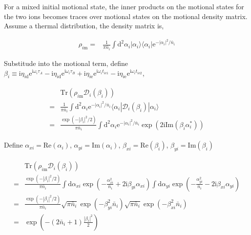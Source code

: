 \documentclass[10pt,fleqn]{article}
\newcommand{\ud}{\mathrm{d}}
\newcommand{\ue}{\mathrm{e}}
\newcommand{\ui}{\mathrm{i}}
\newcommand{\Tr}{\mathrm{Tr}}
\newcommand{\eqar}[1]
{
  \begin{align}
    #1
  \end{align}
}
\newcommand{\paren}[1]{{\left({#1}\right)}}
\newcommand{\abs}[1]{{\left|{#1}\right|}}
\begin{document}
For a mixed initial motional state, the inner products on the motional states for the two ions becomes traces over motional states on the motional density matrix. Assume a thermal distribution, the density matrix is,
\eqar{
  \rho_{i\mathrm{m}}=&\frac{1}{\pi {\bar n_i}}\int\ud^2\alpha_i |\alpha_i\rangle\langle\alpha_i|\ue^{-\abs{\alpha_i}^2/{\bar n_i}}
}
Substitude into the motional term, define $\beta_{i}\equiv\ui\eta_{i\mathrm{d}}\ue^{\ui\omega_i\tau_A}-\ui\eta_{i\mathrm{d}}\ue^{\ui\omega_i\tau_B}+\ui\eta_{i\mathrm{e}}\ue^{\ui\omega_it_{i\mathrm{e}1}}-\ui\eta_{i\mathrm{e}}\ue^{\ui\omega_it_{i\mathrm{e}2}}$,
\eqar{
  \begin{split}
    &\Tr\paren{\rho_{i\mathrm{m}}\mathcal{D}_i(\beta_i)}\\
    =&\frac{1}{\pi {\bar n_i}}\int\ud^2\alpha_i \ue^{-\abs{\alpha_i}^2/{\bar n_i}}\langle\alpha_i|\mathcal{D}_i(\beta_i)|\alpha_i\rangle\\
    =&\frac{\exp\paren{-\abs{\beta_i}^2/2}}{\pi {\bar n_i}}\int\ud^2\alpha_i \ue^{-\abs{\alpha_i}^2/{\bar n_i}}\exp\paren{2\ui\mathrm{Im}\paren{\beta_i\alpha_i^*}}
  \end{split}
}
Define $\alpha_{xi}=\mathrm{Re}(\alpha_i)$, $\alpha_{yi}=\mathrm{Im}(\alpha_i)$, $\beta_{xi}=\mathrm{Re}(\beta_i)$, $\beta_{yi}=\mathrm{Im}(\beta_i)$
\eqar{
  \begin{split}
    &\Tr\paren{\rho_{i\mathrm{m}}\mathcal{D}_i(\beta_i)}\\
    =&\frac{\exp\paren{-\abs{\beta_i}^2/2}}{\pi {\bar n_i}}
       \int\ud\alpha_{xi}\exp\paren{-\frac{\alpha_{xi}^2}{\bar n_i}+2\ui\beta_{yi}\alpha_{xi}}
       \int\ud\alpha_{yi}\exp\paren{-\frac{\alpha_{yi}^2}{\bar n_i}-2\ui\beta_{xi}\alpha_{yi}}\\
    =&\frac{\exp\paren{-\abs{\beta_i}^2/2}}{\pi {\bar n_i}}
       \sqrt{\pi\bar n_i}\exp\paren{-\beta_{yi}^2\bar n_i}
       \sqrt{\pi\bar n_i}\exp\paren{-\beta_{xi}^2\bar n_i}\\
    =&\exp\paren{-\paren{2\bar n_i+1}\frac{\abs{\beta_i}^2}{2}}
  \end{split}
}
\end{document}
